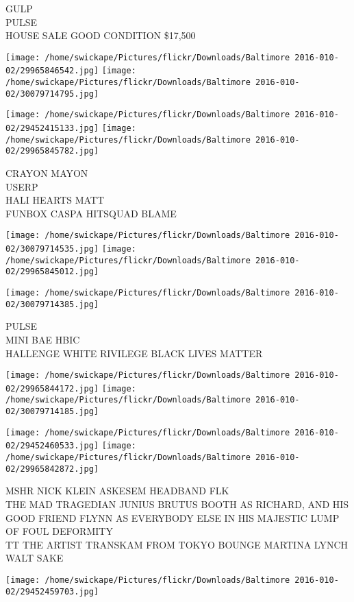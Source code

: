 \documentclass[10pt,letterpaper]{article}
\begin{document}
GULP\\
PULSE\\
HOUSE SALE GOOD CONDITION \$17,500
\pagebreak

\texttt{[image: /home/swickape/Pictures/flickr/Downloads/Baltimore 2016-010-02/29965846542.jpg]}
\texttt{[image: /home/swickape/Pictures/flickr/Downloads/Baltimore 2016-010-02/30079714795.jpg]}

\texttt{[image: /home/swickape/Pictures/flickr/Downloads/Baltimore 2016-010-02/29452415133.jpg]}
\texttt{[image: /home/swickape/Pictures/flickr/Downloads/Baltimore 2016-010-02/29965845782.jpg]}

CRAYON MAYON\\
USERP\\
HALI HEARTS MATT\\
FUNBOX CASPA HITSQUAD BLAME
\pagebreak

\texttt{[image: /home/swickape/Pictures/flickr/Downloads/Baltimore 2016-010-02/30079714535.jpg]}
\texttt{[image: /home/swickape/Pictures/flickr/Downloads/Baltimore 2016-010-02/29965845012.jpg]}

\vspace{0.25in}
\texttt{[image: /home/swickape/Pictures/flickr/Downloads/Baltimore 2016-010-02/30079714385.jpg]}

PULSE\\
MINI BAE HBIC\\
HALLENGE WHITE RIVILEGE BLACK LIVES MATTER
\pagebreak

\texttt{[image: /home/swickape/Pictures/flickr/Downloads/Baltimore 2016-010-02/29965844172.jpg]}
\texttt{[image: /home/swickape/Pictures/flickr/Downloads/Baltimore 2016-010-02/30079714185.jpg]}

\texttt{[image: /home/swickape/Pictures/flickr/Downloads/Baltimore 2016-010-02/29452460533.jpg]}
\texttt{[image: /home/swickape/Pictures/flickr/Downloads/Baltimore 2016-010-02/29965842872.jpg]}

MSHR NICK KLEIN ASKESEM HEADBAND FLK\\
THE MAD TRAGEDIAN JUNIUS BRUTUS BOOTH AS RICHARD, AND HIS GOOD FRIEND FLYNN AS EVERYBODY ELSE IN HIS MAJESTIC LUMP OF FOUL DEFORMITY\\
TT THE ARTIST TRANSKAM FROM TOKYO BOUNGE MARTINA LYNCH\\
WALT SAKE
\pagebreak

\texttt{[image: /home/swickape/Pictures/flickr/Downloads/Baltimore 2016-010-02/29452459703.jpg]}
\end{document}
